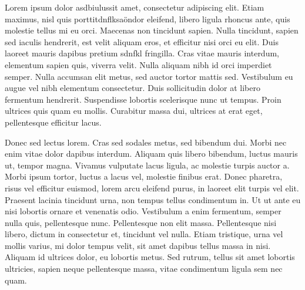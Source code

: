 \documentclass[../main.tex]{subfiles}
\begin{document}
Lorem ipsum dolor asdbiulussit amet, consectetur adipiscing elit. Etiam maximus, nisl quis porttitdnflksaöndor eleifend, libero ligula rhoncus ante, quis molestie tellus mi eu orci. Maecenas non tincidunt sapien. Nulla tincidunt, sapien sed iaculis hendrerit, est velit aliquam eros, et efficitur nisi orci eu elit. Duis laoreet mauris dapibus pretium sdnfkl fringilla. Cras vitae mauris interdum, elementum sapien quis, viverra velit. Nulla aliquam nibh id orci imperdiet semper. Nulla accumsan elit metus, sed auctor tortor mattis sed. Vestibulum eu augue vel nibh elementum consectetur. Duis sollicitudin dolor at libero fermentum hendrerit. Suspendisse lobortis scelerisque nunc ut tempus. Proin ultrices quis quam eu mollis. Curabitur massa dui, ultrices at erat eget, pellentesque efficitur lacus.

Donec sed lectus lorem. Cras sed sodales metus, sed bibendum dui. Morbi nec enim vitae dolor dapibus interdum. Aliquam quis libero bibendum, luctus mauris ut, tempor magna. Vivamus vulputate lacus ligula, ac molestie turpis auctor a. Morbi ipsum tortor, luctus a lacus vel, molestie finibus erat. Donec pharetra, risus vel efficitur euismod, lorem arcu eleifend purus, in laoreet elit turpis vel elit. Praesent lacinia tincidunt urna, non tempus tellus condimentum in. Ut ut ante eu nisi lobortis ornare et venenatis odio. Vestibulum a enim fermentum, semper nulla quis, pellentesque nunc. Pellentesque non elit massa. Pellentesque nisi libero, dictum in consectetur et, tincidunt vel nulla. Etiam tristique, urna vel mollis varius, mi dolor tempus velit, sit amet dapibus tellus massa in nisi. Aliquam id ultrices dolor, eu lobortis metus. Sed rutrum, tellus sit amet lobortis ultricies, sapien neque pellentesque massa, vitae condimentum ligula sem nec quam.
\end{document}
